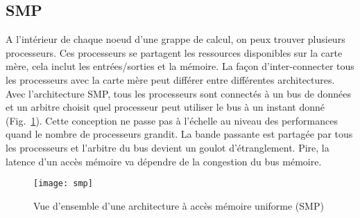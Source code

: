 \subsection{SMP}
A l'intérieur de chaque noeud d'une grappe de calcul, on peux trouver plusieurs processeurs.
%
Ces processeurs se partagent les ressources disponibles sur la carte mère, cela inclut les entrées/sorties et la mémoire.
%
La façon d'inter-connecter tous les processeurs avec la carte mère peut différer entre différentes architectures.
%
Avec l'architecture SMP, tous les processeurs sont connectés à un bus de données et un arbitre choisit quel processeur peut utiliser le bus à un instant donné (Fig.~\ref{fig:smp}).
%
Cette conception ne passe pas à l'échelle au niveau des performances quand le nombre de processeurs grandit.
%
La bande passante est partagée par tous les processeurs et l'arbitre du bus devient un goulot d'étranglement.
%
Pire, la latence d'un accès mémoire va dépendre de la congestion du bus mémoire.

\begin{figure}[!ht]
        \centering
        \texttt{[image: smp]}
        \caption{Vue d'ensemble d'une architecture à accès mémoire uniforme (SMP)}
        \label{fig:smp}
\end{figure}
